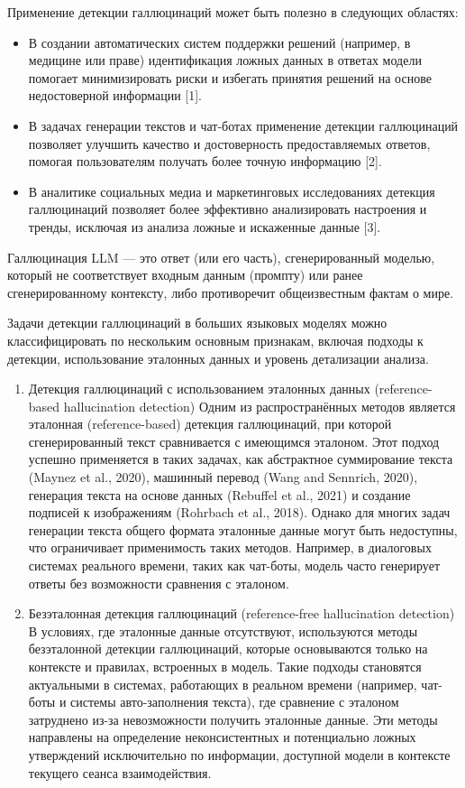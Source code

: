 \documentclass[12pt]{article}
\begin{document}
Применение детекции галлюцинаций может быть полезно в следующих областях:
\begin{itemize}
    \item В создании автоматических систем поддержки решений (например, в медицине или праве) идентификация ложных данных в ответах модели помогает минимизировать риски и избегать принятия решений на основе недостоверной информации [1].
    \item В задачах генерации текстов и чат-ботах применение детекции галлюцинаций позволяет улучшить качество и достоверность предоставляемых ответов, помогая пользователям получать более точную информацию [2].
    \item В аналитике социальных медиа и маркетинговых исследованиях детекция галлюцинаций позволяет более эффективно анализировать настроения и тренды, исключая из анализа ложные и искаженные данные [3].
\end{itemize}
Галлюцинация LLM — это ответ (или его часть), сгенерированный моделью, который не соответствует входным данным (промпту) или ранее сгенерированному контексту, либо противоречит общеизвестным фактам о мире. 

Задачи детекции галлюцинаций в больших языковых моделях можно классифицировать по нескольким основным признакам, включая подходы к детекции, использование эталонных данных и уровень детализации анализа. 
\begin{enumerate}
\item Детекция галлюцинаций с использованием эталонных данных (reference-based hallucination detection)  
   Одним из распространённых методов является эталонная (reference-based) детекция галлюцинаций, при которой сгенерированный текст сравнивается с имеющимся эталоном. Этот подход успешно применяется в таких задачах, как абстрактное суммирование текста (Maynez et al., 2020), машинный перевод (Wang and Sennrich, 2020), генерация текста на основе данных (Rebuffel et al., 2021) и создание подписей к изображениям (Rohrbach et al., 2018). Однако для многих задач генерации текста общего формата эталонные данные могут быть недоступны, что ограничивает применимость таких методов. Например, в диалоговых системах реального времени, таких как чат-боты, модель часто генерирует ответы без возможности сравнения с эталоном. 

\item Безэталонная детекция галлюцинаций (reference-free hallucination detection) 
   В условиях, где эталонные данные отсутствуют, используются методы безэталонной детекции галлюцинаций, которые основываются только на контексте и правилах, встроенных в модель. Такие подходы становятся актуальными в системах, работающих в реальном времени (например, чат-боты и системы авто-заполнения текста), где сравнение с эталоном затруднено из-за невозможности получить эталонные данные. Эти методы направлены на определение неконсистентных и потенциально ложных утверждений исключительно по информации, доступной модели в контексте текущего сеанса взаимодействия.
\end{enumerate}
\end{document}
